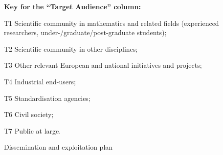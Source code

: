 \begin{table}
\smallskip
{\bf Key for the ``Target Audience'' column:}
\begin{compactenum}
\item[T1] Scientific community in mathematics and related fields 
     (experienced researchers, under-/graduate/post-graduate students);
\item[T2] Scientific community in other disciplines;
\item[T3] Other relevant European and national initiatives and projects;
\item[T4] Industrial end-users;
\item[T5] Standardisation agencies;
\item[T6] Civil society;
\item[T7] Public at large.
\end{compactenum}
\caption{\label{table:dissem-plan}Dissemination and exploitation plan}
\end{table}

